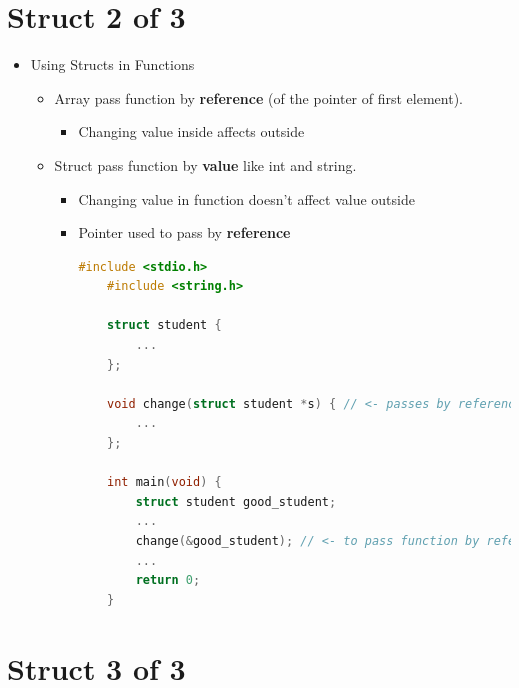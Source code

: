 \documentclass[12pt]{article}
\begin{document}
\bigskip

\section*{Struct 2 of 3}

\bigskip

\begin{itemize}
    \item Using Structs in Functions
    \begin{itemize}
        \item Array pass function by \textbf{reference} (of the pointer of first element).
        \begin{itemize}
            \item Changing value inside affects outside
        \end{itemize}
        \item Struct pass function by \textbf{value} like int and string.

        \begin{itemize}
            \item Changing value in function doesn't affect value outside
            \item Pointer used to pass by \textbf{reference}

    \begin{lstlisting}[language=c,caption={struct\_example\_2.c}]
    #include <stdio.h>
    #include <string.h>

    struct student {
        ...
    };

    void change(struct student *s) { // <- passes by reference
        ...
    };

    int main(void) {
        struct student good_student;
        ...
        change(&good_student); // <- to pass function by reference (This is too cool!!!)
        ...
        return 0;
    }
    \end{lstlisting}
        \end{itemize}

    \end{itemize}
\end{itemize}

\bigskip

\section*{Struct 3 of 3}

\bigskip
\end{document}
